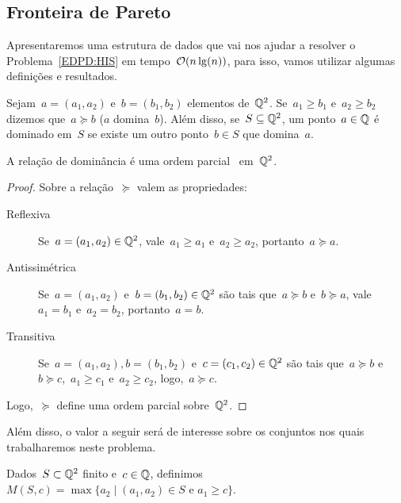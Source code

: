 
\subsection{Fronteira de Pareto}

Apresentaremos uma estrutura de dados que vai nos ajudar a resolver o Problema~\ref{EDPD:HIS} em tempo~$\mathcal{O}(n\lg(n))$, para isso, vamos utilizar algumas definições e resultados.

\begin{defi}
Sejam~${ a = (a_1,a_2) }$ e~${ b = (b_1,b_2) }$ elementos de~$\mathbb{Q}^2$. Se~${ a_1 \geq b_1 }$ e~${ a_2 \geq b_2 }$ dizemos que~${ a \succeq b }$ ($a$ domina~$b$). Além disso, se~${ S \subseteq \mathbb{Q}^2 }$, um ponto~${ a \in \mathbb{Q} }$ é dominado em~$S$ se existe um outro ponto~$b \in S$ que domina~$a$.
\end{defi}

\begin{prop}
A relação de dominância é uma ordem parcial~\cite[Apêndice B]{CLRS} em~$\mathbb{Q}^2$.
\end{prop}
\begin{proof}
Sobre a relação~$\succeq$ valem as propriedades:
\begin{description}
\item[Reflexiva] Se~$a = (a_1,a_2) \in \mathbb{Q}^2$, vale~$a_1 \geq a_1$ e~$a_2 \geq a_2$, portanto~$a \succeq a$.
\item[Antissimétrica] Se~$a = (a_1,a_2)$ e~$b = (b_1,b_2) \in \mathbb{Q}^2$ são tais que~$a \succeq b$ e~$b \succeq a$, vale~$a_1 = b_1$ e~$a_2 = b_2$, portanto~$a = b$.
\item[Transitiva] Se~$a = (a_1,a_2), b = (b_1,b_2)$ e~$c = (c_1,c_2) \in \mathbb{Q}^2$ são tais que~$a \succeq b$ e~$b \succeq c$,~$a_1 \geq c_1$ e~$a_2 \geq c_2$, logo,~$a \succeq c$.
\end{description}
Logo,~$\succeq$ define uma ordem parcial sobre~$\mathbb{Q}^2$.
\end{proof}

Além disso, o valor a seguir será de interesse sobre os conjuntos nos quais trabalharemos neste problema.
\begin{defi}
Dados~$S \subset \mathbb{Q}^2$ finito e~$c \in \mathbb{Q}$, definimos~${M(S,c) = \max\{a_2 \mid (a_1,a_2) \in S \text{ e } a_1 \geq c\}}$.
\end{defi}

